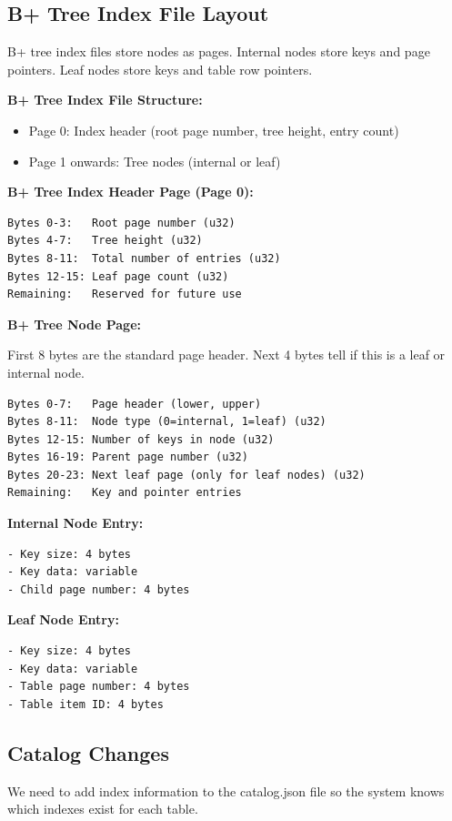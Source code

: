 \documentclass[11pt,a4paper]{article}
\begin{document}
\subsection{B+ Tree Index File Layout}

B+ tree index files store nodes as pages. Internal nodes store keys and page pointers. Leaf nodes store keys and table row pointers.

\textbf{B+ Tree Index File Structure:}
\begin{itemize}
\item Page 0: Index header (root page number, tree height, entry count)
\item Page 1 onwards: Tree nodes (internal or leaf)
\end{itemize}

\textbf{B+ Tree Index Header Page (Page 0):}
\begin{lstlisting}
Bytes 0-3:   Root page number (u32)
Bytes 4-7:   Tree height (u32)
Bytes 8-11:  Total number of entries (u32)
Bytes 12-15: Leaf page count (u32)
Remaining:   Reserved for future use
\end{lstlisting}

\textbf{B+ Tree Node Page:}

First 8 bytes are the standard page header. Next 4 bytes tell if this is a leaf or internal node.

\begin{lstlisting}
Bytes 0-7:   Page header (lower, upper)
Bytes 8-11:  Node type (0=internal, 1=leaf) (u32)
Bytes 12-15: Number of keys in node (u32)
Bytes 16-19: Parent page number (u32)
Bytes 20-23: Next leaf page (only for leaf nodes) (u32)
Remaining:   Key and pointer entries
\end{lstlisting}

\textbf{Internal Node Entry:}
\begin{lstlisting}
- Key size: 4 bytes
- Key data: variable
- Child page number: 4 bytes
\end{lstlisting}

\textbf{Leaf Node Entry:}
\begin{lstlisting}
- Key size: 4 bytes
- Key data: variable
- Table page number: 4 bytes
- Table item ID: 4 bytes
\end{lstlisting}

\subsection{Catalog Changes}

We need to add index information to the catalog.json file so the system knows which indexes exist for each table.
\end{document}
